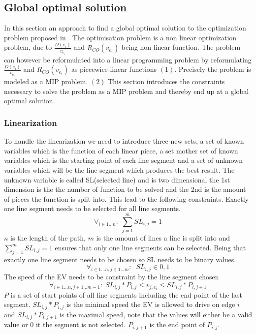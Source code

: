 \subsection{Global optimal solution}
In this section an approach to find a global optimal solution to the optimization problem proposed in . The optimisation problem is a non linear optimization problem, due to $\frac{D(e_i)}{v_{e_i}}$ and $R_{CO}(v_{e_i})$ being non linear function. The problem can however be reformulated into a linear programming problem by reformulating $\frac{D(e_i)}{v_{e_i}}$ and $R_{CO}(v_{e_i})$ as piecewice-linear functions $(1)$. Precisely the problem is modeled as a MIP problem. $(2)$  
This section introduces the constraints necessary to solve the problem as a MIP problem and thereby end up at a global optimal solution.
\subsubsection{Linearization}
To handle the linearization we need to introduce three new sets, a set of known variables which is the function of each linear piece, a set mother set of known variables which is the starting point of each line segment and a set of unknown variables which will be the line segment which produces the best result. 
The unknown variable is called SL(selected line) and is two dimensional the 1st dimension is the the number of function to be solved and the 2nd is the amount of pieces the function is split into. This lead to the following constraints.   
Exactly one line segment needs to be selected for all line segments. 
\begin{equation*}
\forall_{i\in1 \dots n }:\; \sum_{j=1}^{m} SL_{i,j} = 1
\end{equation*}
$n$ is the length of the path, $m$ is the amount of lines a line is split into and $\sum_{j=1}^{m} SL_{i,j} = 1$ ensures that only one line segments can be selected. 
Being that exactly one line segment needs to be chosen so SL needs to be binary values. 
\begin{equation*}
\forall_{i\in1 \dots n, j \in 1 \dots m}: \; \; SL_{i,j} \in{0,1} 
\end{equation*}
The speed of the EV needs to be constraint by the line segment chosen
\begin{equation*}
\forall_{i\in1 \dots n, j \in 1 \dots m-1}:\; SL_{i,j} * P_{i,j}  \le  v_{j,e_i} \le SL_{i,j}*P_{i,j+1}
\end{equation*}
$P$ is a set of start points of all line segments including the end point of the last segment. $SL_{i,j} * P_{i,j}$ is the minimal speed the EV is allowed to drive on edge $i$ and $SL_{i,j}*P_{i,j+1}$ is the maximal speed, note that the values will either be a valid value or $0$ it the segment is not selected. $P_{i,j+1}$ is the end point of $P_{i,j}$. 
